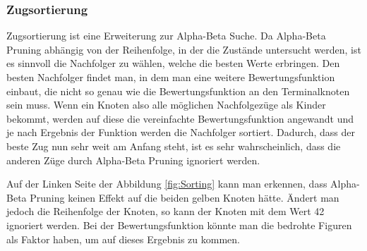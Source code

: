 \documentclass[12pt,a4paper,bibliography=totocnumbered,listof=totocnumbered]{article}
\begin{document}
\subsubsection{Zugsortierung}
\label{chap:Zugsortierung}
Zugsortierung ist eine Erweiterung zur Alpha-Beta Suche.
Da Alpha-Beta Pruning abhängig von der Reihenfolge, in der die Zustände untersucht werden, ist es sinnvoll
die Nachfolger zu wählen, welche die besten Werte erbringen. Den besten Nachfolger findet man, in dem man eine
weitere Bewertungsfunktion einbaut, die nicht so genau wie die Bewertungsfunktion an den Terminalknoten sein muss. 
Wenn ein Knoten also alle möglichen Nachfolgezüge als Kinder bekommt, werden auf diese die vereinfachte Bewertungsfunktion
angewandt und je nach Ergebnis der Funktion werden die Nachfolger sortiert. Dadurch, dass der beste Zug nun
sehr weit am Anfang steht, ist es sehr wahrscheinlich, dass die anderen Züge durch Alpha-Beta Pruning ignoriert werden.
\cite{KuenstlicheIntelligenzNorvig}

Auf der Linken Seite der Abbildung \ref{fig:Sorting} kann man erkennen, dass Alpha-Beta Pruning keinen Effekt 
auf die beiden gelben Knoten hätte. Ändert man jedoch die Reihenfolge der Knoten, so kann der Knoten mit dem Wert 42
ignoriert werden. Bei der Bewertungsfunktion könnte man die bedrohte Figuren als Faktor haben, um auf dieses Ergebnis zu kommen.
\end{document}
